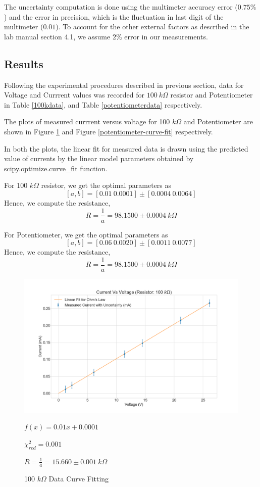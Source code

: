 \documentclass[letterpaper,12pt]{article}
\begin{document}
The uncertainty computation is done using the multimeter accuracy error ($0.75 \%$) and the error in 
precision, which is the fluctuation in last digit of the multimeter ($0.01$). To account for the other
external factors as described in the lab manual section 4.1\cite{lab-manual-ex1}, we assume $2\%$ error in our measurements.

\subsection{Results}

Following the experimental procedures described in previous section, data for Voltage and Currrent values was recorded for 
$100\ k\Omega$ resistor and Potentiometer in Table \ref{100kdata}, and Table \ref{potentiometerdata} respectively.

The plots of measured currrent versus voltage for 100 $k\Omega$ and Potentiometer are shown in Figure \ref{100k-curve-fit}
and Figure \ref{potentiometer-curve-fit} respectively.

In both the plots, the linear fit for measured data is drawn using the predicted value of currents by the linear model  parameters
obtained by scipy.optimize.curve\_fit function.

For 100 $k\Omega$ resistor, we get the optimal parameters as
$$[a,b] = [0.01\ 0.0001] \pm [0.0004\ 0.0064]$$
Hence, we compute the resistance,
$$R = \frac{1}{a} = 98.1500 \pm 0.0004 \ k\Omega$$

For Potentiometer, we get the optimal parameters as
$$[a,b] = [0.06\ 0.0020] \pm [0.0011\ 0.0077]$$
Hence, we compute the resistance,
$$R = \frac{1}{a} = 98.1500 \pm 0.0004 \ k\Omega$$

\begin{figure}[H]
  \centering
  \includegraphics[width=0.95\linewidth]{../Exercise1/lab_1_ex_1_plot_100k.png}   
  \begin{center}
    $f(x) = 0.01 x + 0.0001 $
    
    $\chi^2_{red} = 0.001$

    $R = \frac{1}{a} = 15.660 \pm 0.001 \ k\Omega$
  \end{center}  
  \caption{100 $k\Omega$ Data Curve Fitting}
  \label{100k-curve-fit}
\end{figure}
\end{document}
